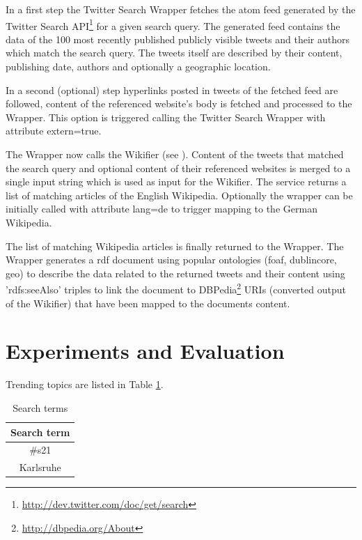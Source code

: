 \documentclass{llncs}
\begin{document}
In a first step the Twitter Search Wrapper fetches the atom feed
generated by the Twitter Search
API\footnote{\url{http://dev.twitter.com/doc/get/search}} for a given search
query. The generated feed contains the data of the 100 most recently published
publicly visible tweets and their authors which match the search query. The tweets itself are described by
their content, publishing date, authors and optionally a geographic location. 

In a second (optional) step hyperlinks posted in tweets of the fetched
feed are followed, content of the referenced website's body is fetched and
processed to the Wrapper. This option is triggered calling the Twitter Search
Wrapper with attribute extern=true.

The Wrapper now calls the Wikifier (see \cite{key:wikifier}). Content of
the tweets that matched the search query and optional content of their referenced websites is merged
to a single input string which is used as input for the Wikifier. The service
returns a list of matching articles of the English
Wikipedia. Optionally the wrapper can be initially called with attribute lang=de
to trigger mapping to the German Wikipedia.

The list of matching Wikipedia articles is finally returned to the Wrapper. The
Wrapper generates a rdf document using popular ontologies (foaf, dublincore, geo) to
describe the data related to the returned tweets and their content using
'rdfs:seeAlso' triples to link the document to
DBPedia\footnote{\url{http://dbpedia.org/About}} URIs (converted output of the
Wikifier) that have been mapped to the documents content.

\section{Experiments and Evaluation}
\label{sect:eval}

Trending topics are listed in Table \ref{tbl:terms}.

\begin{table}[ht*]
\centering
\begin{tabular}{ c }
Search term                    \\
\hline
\#s21 \\
Karlsruhe\\
\end{tabular}
\caption{Search terms}\label{tbl:terms}
\end{table}

\begin{definition}[Stability]

\end{definition}
\end{document}
